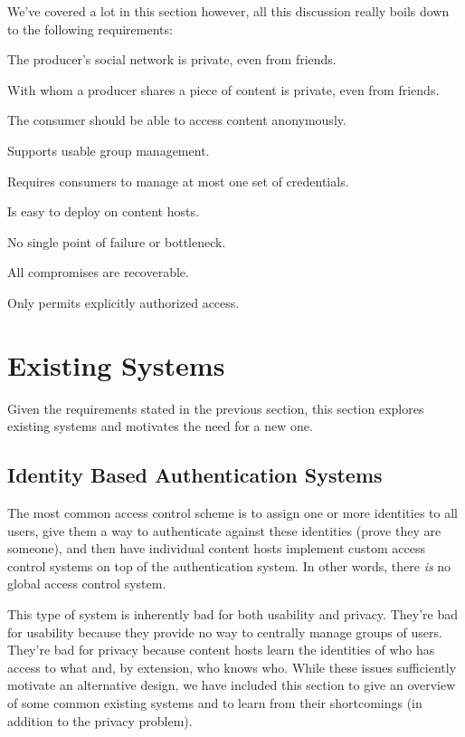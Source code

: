 \documentclass[pdftex,12pt,a4papaer,twoside,notitlepage]{report}
\begin{document}
We've covered a lot in this section however, all this discussion really boils
down to the following requirements:

\begin{compactenum}
\item The producer's social network is private, even from friends.
\item With whom a producer shares a piece of content is private, even from friends.
\item The consumer should be able to access content anonymously.
  \vspace{1em}
\item Supports usable group management.
\item Requires consumers to manage at most one set of credentials.
\item Is easy to deploy on content hosts.
  \vspace{1em}
\item No single point of failure or bottleneck.
\item All compromises are recoverable.
\item Only permits explicitly authorized access.
\end{compactenum}

\section{Existing Systems} 

Given the requirements stated in the previous section, this section explores existing
systems and motivates the need for a new one.

\subsection{Identity Based Authentication Systems}

The most common access control scheme is to assign one or more identities to all
users, give them a way to authenticate against these identities (prove they are
someone), and then have individual content hosts implement custom access control
systems on top of the authentication system. In other words, there \emph{is} no
global access control system.

This type of system is inherently bad for both usability and privacy. They're
bad for usability because they provide no way to centrally manage groups of
users. They're bad for privacy because content hosts learn the identities of who
has access to what and, by extension, who knows who. While these issues
sufficiently motivate an alternative design, we have included this section to
give an overview of some common existing systems and to learn from their
shortcomings (in addition to the privacy problem).
\end{document}
